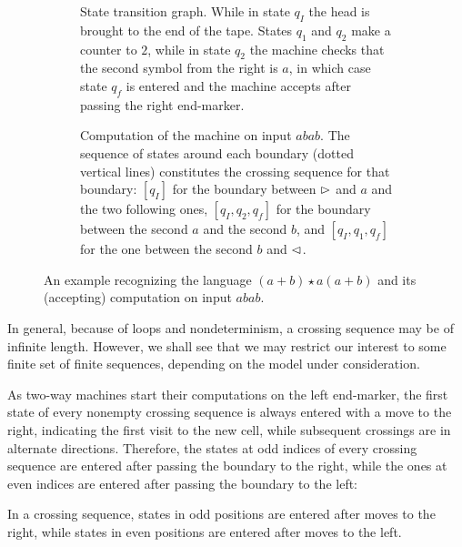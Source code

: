 \begin{figure}
	\centering
	\begin{subfigure}[b]{0.49\textwidth}
		\centering
		
		\caption{State transition graph.
			While in state $q_I$ the head is brought to the end of the tape. States $q_1$ and $q_2$ make a counter to $2$, while in state $q_2$ the machine checks that the second symbol from the right is $a$, in which case state $q_f$ is entered and the machine accepts after passing the right end-marker.\newline}
	\end{subfigure}
	\hfill
	\begin{subfigure}[b]{0.49\textwidth}
		\centering
		
		\caption{Computation of the machine on input $abab$.
			The sequence of states around each boundary (dotted vertical lines) constitutes the crossing sequence for that boundary: $[q_I]$ for the boundary between $\rhd$ and $a$ and the two following ones, $[q_I,q_2,q_f]$ for the boundary between the second $a$ and the second $b$, and $[q_I,q_1,q_f]$ for the one between the second $b$ and $\lhd$.}
		\label{sfig:example-crosseq-2}
	\end{subfigure}

	\caption{An example \TDFA recognizing the language $(a+b)\star a(a+b)$ and its (accepting) computation on input $abab$.}
	\label{fig:example-crosseq}
\end{figure}

In general, because of loops and nondeterminism, a crossing sequence may be of infinite length.
However, we shall see that we may restrict our interest to some finite set of finite sequences, depending on the model under consideration.

As two-way machines start their computations on the left end-marker, the first state of every nonempty crossing sequence is always entered with a move to the right, indicating the first visit to the new cell, while subsequent crossings are in alternate directions.
Therefore, the states at odd indices of every crossing sequence are entered after passing the boundary to the right, while the ones at even indices are entered after passing the boundary to the left:
\begin{fact}\label{fact:crossing-parity}
	In a crossing sequence, states in odd positions are entered after moves to the right, while states in even positions are entered after moves to the left.
\end{fact}

